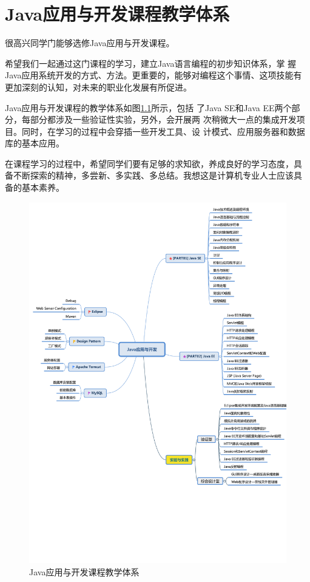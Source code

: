 \chapter{Java应用与开发课程教学体系}

{\kai 很高兴同学门能够选修Java应用与开发课程。

希望我们一起通过这门课程的学习，建立Java语言编程的初步知识体系，掌
握Java应用系统开发的方式、方法。更重要的，能够对编程这个事情、这项技能有
更加深刻的认知，对未来的职业化发展有所促进。

Java应用与开发课程的教学体系如图\ref{fig:java-course-arch}所示，包括
了Java SE和Java EE两个部分，每部分都涉及一些验证性实验，另外，会开展两
次稍微大一点的集成开发项目。同时，在学习的过程中会穿插一些开发工具、设
计模式、应用服务器和数据库的基本应用。

在课程学习的过程中，希望同学们要有足够的求知欲，养成良好的学习态度，具
备不断探索的精神，多尝新、多实践、多总结。我想这是计算机专业人士应该具
备的基本素养。}

\begin{figure}[htb]
\centering
\includegraphics[width=\textwidth]{images/fig-java-course-arch.pdf}
\caption{Java应用与开发课程教学体系}
\label{fig:java-course-arch}
\end{figure}

